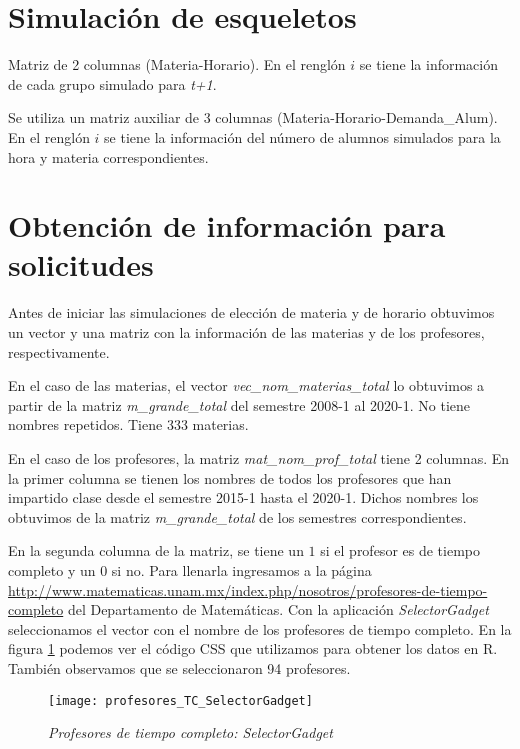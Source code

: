 \section{Simulación de esqueletos}

Matriz de 2 columnas (Materia-Horario). En el renglón $i$ se tiene la información de cada grupo simulado para \textit{t+1}.

Se utiliza un matriz auxiliar de 3 columnas (Materia-Horario-Demanda\_Alum). En el renglón $i$ se tiene la información del número de alumnos simulados para la hora y materia correspondientes.


\section{Obtención de información para solicitudes}

Antes de iniciar las simulaciones de elección de materia y de horario obtuvimos un vector y una matriz con la información de las materias y de los profesores, respectivamente.

En el caso de las materias, el vector \textit{vec\_nom\_materias\_total} lo obtuvimos a partir de la matriz \textit{m\_grande\_total} del semestre 2008-1 al 2020-1. No tiene nombres repetidos. Tiene 333 materias.

En el caso de los profesores, la matriz \textit{mat\_nom\_prof\_total} tiene 2 columnas. En la primer columna se tienen los nombres de todos los profesores que han impartido clase desde el semestre 2015-1 hasta el 2020-1. Dichos nombres los obtuvimos de la matriz \textit{m\_grande\_total} de los semestres correspondientes.

En la segunda columna de la matriz, se tiene un $1$ si el profesor es de tiempo completo y un $0$ si no. Para llenarla ingresamos a la página \url{http://www.matematicas.unam.mx/index.php/nosotros/profesores-de-tiempo-completo} del Departamento de Matemáticas. Con la aplicación \textit{SelectorGadget} seleccionamos el vector con el nombre de los profesores de tiempo completo. En la figura \ref{profTC_SelectorGadget} podemos ver el código CSS que utilizamos para obtener los datos en R. También observamos que se seleccionaron 94 profesores.

\begin{figure}[H]
\centering
\texttt{[image: profesores\_TC\_SelectorGadget]} %
\caption{\textit{Profesores de tiempo completo: SelectorGadget}}\label{profTC_SelectorGadget}
\end{figure}

